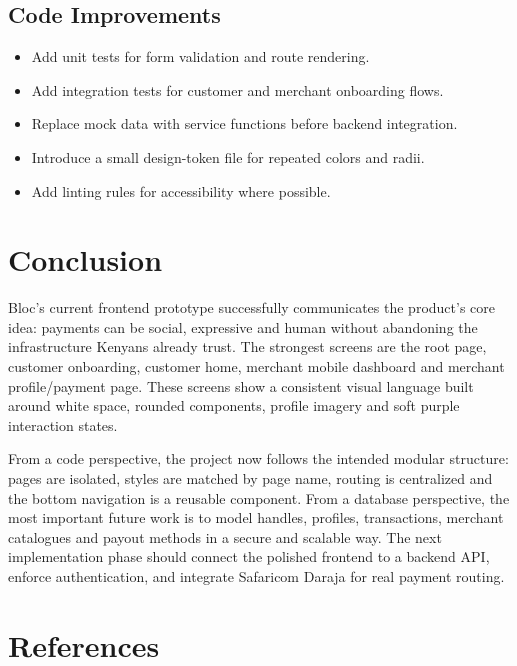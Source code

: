 \documentclass[12pt,a4paper]{article}
\begin{document}
\subsection{Code Improvements}
\begin{itemize}
    \item Add unit tests for form validation and route rendering.
    \item Add integration tests for customer and merchant onboarding flows.
    \item Replace mock data with service functions before backend integration.
    \item Introduce a small design-token file for repeated colors and radii.
    \item Add linting rules for accessibility where possible.
\end{itemize}

\section{Conclusion}
Bloc's current frontend prototype successfully communicates the product's core idea: payments can be social, expressive and human without abandoning the infrastructure Kenyans already trust. The strongest screens are the root page, customer onboarding, customer home, merchant mobile dashboard and merchant profile/payment page. These screens show a consistent visual language built around white space, rounded components, profile imagery and soft purple interaction states.

From a code perspective, the project now follows the intended modular structure: pages are isolated, styles are matched by page name, routing is centralized and the bottom navigation is a reusable component. From a database perspective, the most important future work is to model handles, profiles, transactions, merchant catalogues and payout methods in a secure and scalable way. The next implementation phase should connect the polished frontend to a backend API, enforce authentication, and integrate Safaricom Daraja for real payment routing.

\newpage
\section*{References}
\end{document}

